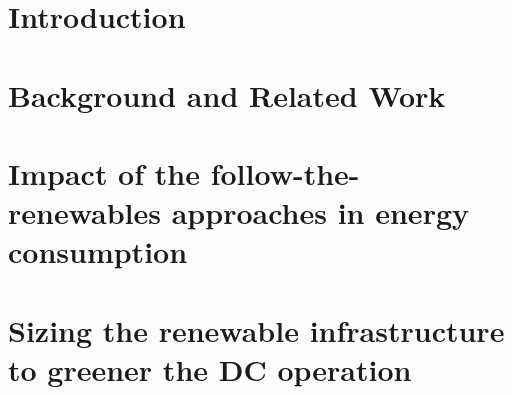 
\chapter{Introduction} 
\label{chap:intro}





\chapter{Background and Related Work}
\label{chap:background}





\chapter[Impact of the follow-the-renewables approaches in energy consumption]{Impact of the follow-the-renewables approaches in energy consumption\footnotemark}
\label{chap:smartgreens}





\chapter[Sizing the renewable infrastructure to greener the DC operation]{Sizing the renewable infrastructure to greener the DC operation\footnotemark}
\label{chap:ccgrid}







